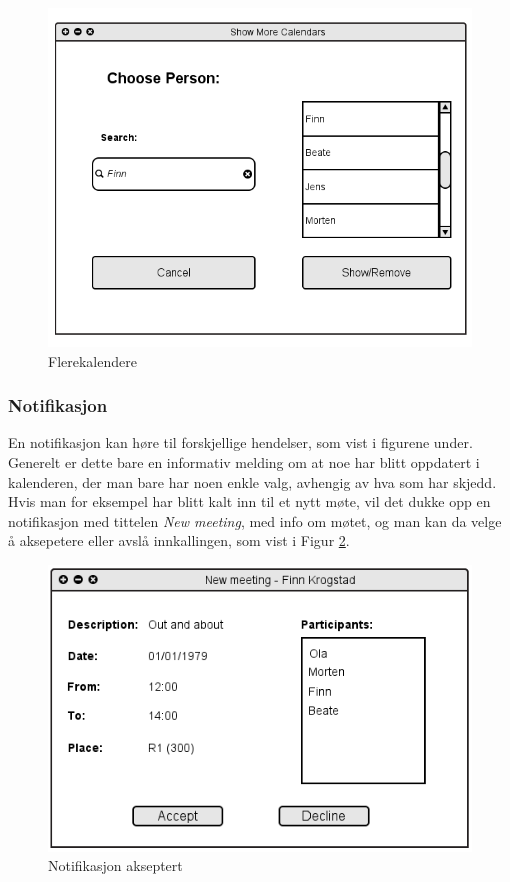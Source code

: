 \begin{figure}[H]
\centering
\includegraphics[scale=0.5]{images/flerekalendere.png}
\caption{Flerekalendere}
\label{flerekalendere_image}
\end{figure}

\subsubsection{Notifikasjon}
En notifikasjon kan høre til forskjellige hendelser, som vist i figurene under. Generelt er dette bare en informativ melding om at noe har blitt oppdatert i kalenderen, der man bare har noen enkle valg, avhengig av hva som har skjedd. Hvis man for eksempel har blitt kalt inn til et nytt møte, vil det dukke opp en notifikasjon med tittelen \emph{New meeting}, med info om møtet, og man kan da velge å aksepetere eller avslå innkallingen, som vist i Figur \ref{notifikasjon_akseptert_image}.

\begin{figure}[H]
\centering
\includegraphics[scale=0.65]{images/notifikasjon_akseptert.png}
\caption{Notifikasjon akseptert}
\label{notifikasjon_akseptert_image}
\end{figure}

